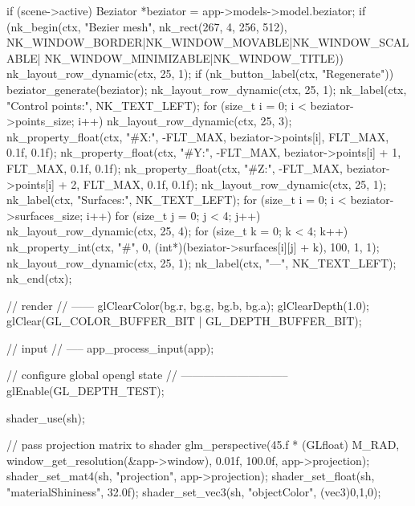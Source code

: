 \documentclass[14pt,a4paper]{extarticle}
\theoremstyle{definition}
\renewcommand{\[}{\begin{singlespace}\begin{equation*}}
\renewcommand{\]}{\end{equation*}\end{singlespace}}
\begin{document}
\begin{multicols}{2}
\begin{ccode}
{{        if (scene->active) {
            Beziator *beziator = app->models->model.beziator;
            if (nk_begin(ctx, "Bezier mesh", nk_rect(267, 4, 256, 512),
                         NK_WINDOW_BORDER|NK_WINDOW_MOVABLE|NK_WINDOW_SCALABLE|
                         NK_WINDOW_MINIMIZABLE|NK_WINDOW_TITLE)) {
                nk_layout_row_dynamic(ctx, 25, 1);
                if (nk_button_label(ctx, "Regenerate"))
                    beziator_generate(beziator);
                nk_layout_row_dynamic(ctx, 25, 1);
                nk_label(ctx, "Control points:", NK_TEXT_LEFT);
                for (size_t i = 0; i < beziator->points_size; i++) {
                    nk_layout_row_dynamic(ctx, 25, 3);
                    nk_property_float(ctx, "#X:", -FLT_MAX, beziator->points[i],
                                      FLT_MAX, 0.1f, 0.1f);
                    nk_property_float(ctx, "#Y:", -FLT_MAX, beziator->points[i] + 1,
                                      FLT_MAX, 0.1f, 0.1f);
                    nk_property_float(ctx, "#Z:", -FLT_MAX, beziator->points[i] + 2,
                                      FLT_MAX, 0.1f, 0.1f);
                }
                nk_layout_row_dynamic(ctx, 25, 1);
                nk_label(ctx, "Surfaces:", NK_TEXT_LEFT);
                for (size_t i = 0; i < beziator->surfaces_size; i++) {
                    for (size_t j = 0; j < 4; j++) {
                        nk_layout_row_dynamic(ctx, 25, 4);
                        for (size_t k = 0; k < 4; k++) {
                            nk_property_int(ctx, "#", 0, (int*)(beziator->surfaces[i][j] + k),
                                              100, 1, 1);
                        }
                    }
                    nk_layout_row_dynamic(ctx, 25, 1);
                    nk_label(ctx, "---", NK_TEXT_LEFT);
                }
            }
            nk_end(ctx);
        }

        // render
        // ------
        glClearColor(bg.r, bg.g, bg.b, bg.a);
        glClearDepth(1.0);
        glClear(GL_COLOR_BUFFER_BIT | GL_DEPTH_BUFFER_BIT);

        // input
        // -----
        app_process_input(app);

        // configure global opengl state
        // -----------------------------
        glEnable(GL_DEPTH_TEST);

        shader_use(sh);

        // pass projection matrix to shader
        glm_perspective(45.f * (GLfloat) M_RAD,
                        window_get_resolution(&app->window),
                        0.01f, 100.0f, app->projection);
        shader_set_mat4(sh, "projection", app->projection);
        shader_set_float(sh, "materialShininess", 32.0f);
        shader_set_vec3(sh, "objectColor", (vec3){0,1,0});

}}
\end{ccode}
\end{multicols}
\end{document}
